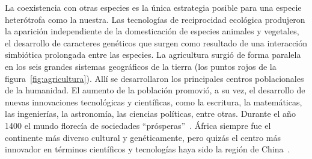 \documentclass[a4paper,10pt]{book}
\theoremstyle{definition}
\begin{document}
La coexistencia con otras especies es la única estrategia posible para una especie heter\'otrofa como la nuestra.
%
Las tecnolog\'ias de reciprocidad ecol\'ogica produjeron la aparici\'on independiente de la domesticaci\'on de especies animales y vegetales, el desarrollo de caracteres gen\'eticos que surgen como resultado de una interacci\'on simbi\'otica prolongada entre las especies.
%
La agricultura surgi\'o de forma paralela en los seis grandes sistemas geogr\'aficos de la tierra (los puntos rojos de la figura~\ref{fig:agricultura}).
%
All\'i se desarrollaron los principales centros poblacionales de la humanidad.
%
El aumento de la poblaci\'on promovi\'o, a su vez, el desarrollo de nuevas innovaciones tecnol\'ogicas y cient\'ificas, como la escritura, la matem\'aticas, las ingenier\'ias, la astronom\'ia, las ciencias pol\'iticas, entre otras.
%
Durante el a\~no 1400 el mundo florec\'ia de sociedades ``pr\'osperas''~\cite{dussel2004-sistemaMundo}.
%
%
África siempre fue el continente m\'as diverso cultural y gen\'eticamente, pero quiz\'as el centro m\'as innovador en t\'erminos cient\'ificos y tecnolog\'ias haya sido la regi\'on de China~\cite{needham2004-generalConclusionsAndReflections}.

\end{document}
